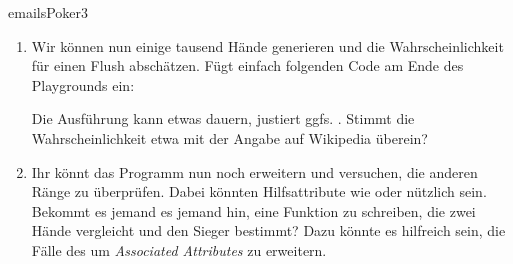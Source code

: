 \documentclass[parskip=half, final]{scrreprt}
\begin{document}
\begin{lecture}
\begin{exc}
\begin{excitem}{emails}{Poker}{3}
\begin{enumerate}
\item Wir können nun einige tausend Hände generieren und die Wahrscheinlichkeit für einen Flush abschätzen. Fügt einfach folgenden Code am Ende des Playgrounds ein:


	Die Ausführung kann etwas dauern, justiert ggfs. . Stimmt die Wahrscheinlichkeit etwa mit der Angabe auf Wikipedia überein?

\item {} Ihr könnt das Programm nun noch erweitern und versuchen, die anderen Ränge zu überprüfen. Dabei könnten Hilfsattribute wie  oder  nützlich sein. Bekommt es jemand es jemand hin, eine Funktion zu schreiben, die zwei Hände vergleicht und den Sieger bestimmt?  Dazu könnte es hilfreich sein, die Fälle des  um \emph{Associated Attributes} zu erweitern.

\end{enumerate}

\end{excitem}

\end{exc}


\end{lecture}
\end{document}
